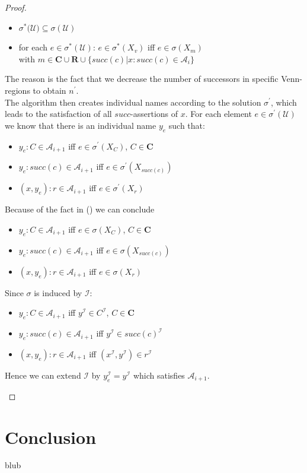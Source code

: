 \documentclass{book}
\theoremstyle{break}
\theoremstyle{definition}
\begin{document}
\begin{proof}
\begin{itemize}
\begin{itemize}
\item $\sigma^\ast(\mathcal{U)}\subseteq\sigma(\mathcal{U})$
\item for each $e\in \sigma^\ast(\mathcal{U})$: $e\in \sigma^\ast(X_v)$ iff $e\in\sigma(X_m)$\\
with $m\in\mathbf{C}\cup\mathbf{R}\cup\{succ(c)|x:succ(c)\in \mathcal{A}_i\}$
\end{itemize}
The reason is the fact that we decrease the number of successors in specific Venn-regions to obtain $n^\prime$.\\
The algorithm then creates individual names according to the solution $\sigma^\prime$, which leads to the satisfaction of all $succ$-assertions of $x$. For each element $e\in\sigma^\prime(\mathcal{U})$ we know that there is an individual name $y_e$ such that:
\begin{itemize}
\item $y_e:C\in\mathcal{A}_{i+1}$ iff $e\in\sigma^\prime(X_C)$, $C\in\mathbf{C}$
\item $y_e:succ(c)\in\mathcal{A}_{i+1}$ iff $e\in\sigma^\prime(X_{succ(c)})$
\item $(x,y_e):r\in\mathcal{A}_{i+1}$ iff $e\in\sigma^\prime(X_r)$
\end{itemize}
Because of the fact in (\dag) we can conclude
\begin{itemize}
\item $y_e:C\in\mathcal{A}_{i+1}$ iff $e\in\sigma(X_C)$, $C\in\mathbf{C}$
\item $y_e:succ(c)\in\mathcal{A}_{i+1}$ iff $e\in\sigma(X_{succ(c)})$
\item $(x,y_e):r\in\mathcal{A}_{i+1}$ iff $e\in\sigma(X_r)$
\end{itemize}
Since $\sigma$ is induced by $\mathcal{I}$:
\begin{itemize}
\item $y_e:C\in\mathcal{A}_{i+1}$ iff $y^\mathcal{I}\in C^\mathcal{I}$, $C\in\mathbf{C}$
\item $y_e:succ(c)\in\mathcal{A}_{i+1}$ iff $y^\mathcal{I}\in succ(c)^\mathcal{I}$
\item $(x,y_e):r\in\mathcal{A}_{i+1}$ iff $(x^\mathcal{I},y^\mathcal{I})\in r^\mathcal{I}$
\end{itemize}
Hence we can extend $\mathcal{I}$ by $y_e^\mathcal{I}=y^\mathcal{I}$ which satisfies $\mathcal{A}_{i+1}$.
\end{itemize}
\end{proof}
\chapter{Conclusion}
blub
\normalem


\end{document}

